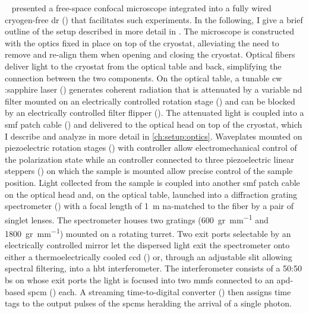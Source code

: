 ~\cite{Descamps2021,Descamps2024} presented a free-space confocal microscope integrated into a fully wired cryogen-free \gls{dr} (\odin) that facilitates such experiments.
In the following, I give a brief outline of the setup described in more detail in .
The microscope is constructed with the optics fixed in place on top of the cryostat, alleviating the need to remove and re-align them when opening and closing the cryostat.
Optical fibers deliver light to the cryostat from the optical table and back, simplifying the connection between the two components.
On the optical table, a tunable \gls{cw} :sapphire laser
(\tisalaser) generates coherent radiation that is attenuated by a variable \gls{nd} filter mounted on an electrically controlled rotation stage (\thorlabsrotator) and can be blocked by an electrically controlled filter flipper (\thorlabsflipper).
The attenuated light is coupled into a \gls{smf} patch cable (\thefiber) and delivered to the optical head on top of the cryostat, which I describe and analyze in more detail in \cref{ch:setup:optics}.
Waveplates mounted on piezoelectric rotation stages (\rotator) with controller \rotatorcontroller allow electromechanical control of the polarization state while an \positionercontroller controller connected to three piezoelectric linear steppers (\positioner) on which the sample is mounted allow precise control of the sample position.
Light collected from the sample is coupled into another \gls{smf} patch cable on the optical head and, on the optical table, launched into a diffraction grating spectrometer (\thespectrometer) with a focal length of \qty{1}{\meter} \acrshort{na}-matched to the fiber by a pair of singlet lenses.
The spectrometer houses two gratings (\qty{600}{gr\per\milli\meter} and \qty{1800}{gr\per\milli\meter}) mounted on a rotating turret.
Two exit ports selectable by an electrically controlled mirror let the dispersed light exit the spectrometer onto either a thermoelectrically cooled \gls{ccd} (\theccd) or, through an adjustable slit allowing spectral filtering, into a \gls{hbt} interferometer.
The interferometer consists of a 50:50 \gls{bs} on whose exit ports the light is focused into two \glspl{mmf} connected to an \gls{apd}-based \gls{spcm} (\thespcm) each.
A streaming time-to-digital converter (\tagger) then assigns time tags to the output pulses of the \glspl{spcm} heralding the arrival of a single photon.

